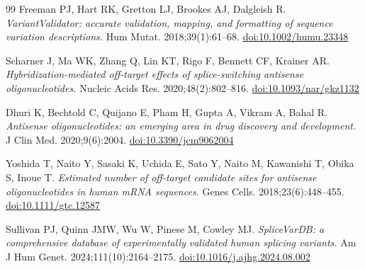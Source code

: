 \documentclass[11pt,a4paper]{article}
\begin{document}
\begin{thebibliography}{99}
Freeman PJ, Hart RK, Gretton LJ, Brookes AJ, Dalgleish R.
\emph{VariantValidator: accurate validation, mapping, and formatting of sequence variation
descriptions.} Hum Mutat. 2018;39(1):61--68.
\href{https://doi.org/10.1002/humu.23348}{doi:10.1002/humu.23348}

Scharner J, Ma WK, Zhang Q, Lin KT, Rigo F, Bennett CF, Krainer AR.
\emph{Hybridization-mediated off-target effects of splice-switching antisense oligonucleotides.}
Nucleic Acids Res. 2020;48(2):802--816.
\href{https://doi.org/10.1093/nar/gkz1132}{doi:10.1093/nar/gkz1132}

Dhuri K, Bechtold C, Quijano E, Pham H, Gupta A, Vikram A, Bahal R.
\emph{Antisense oligonucleotides: an emerging area in drug discovery and development.}
J Clin Med. 2020;9(6):2004.
\href{https://doi.org/10.3390/jcm9062004}{doi:10.3390/jcm9062004}

Yoshida T, Naito Y, Sasaki K, Uchida E, Sato Y, Naito M, Kawanishi T, Obika S, Inoue T.
\emph{Estimated number of off-target candidate sites for antisense oligonucleotides in human mRNA
sequences.} Genes Cells. 2018;23(6):448--455.
\href{https://doi.org/10.1111/gtc.12587}{doi:10.1111/gtc.12587}

Sullivan PJ, Quinn JMW, Wu W, Pinese M, Cowley MJ.
\emph{SpliceVarDB: a comprehensive database of experimentally validated human splicing variants.}
Am J Hum Genet. 2024;111(10):2164--2175.
\href{https://doi.org/10.1016/j.ajhg.2024.08.002}{doi:10.1016/j.ajhg.2024.08.002}

\end{thebibliography}
\end{document}
